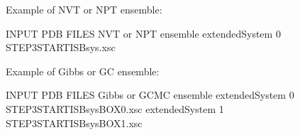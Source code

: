 \documentclass[letterpaper,10pt,english]{sphinxmanual}
\begin{document}
\begin{description}
\sphinxAtStartPar
Example of NVT or NPT ensemble:

\begin{sphinxVerbatim}[commandchars=\\\{\}]
\PYGZsh{}\PYGZsh{}\PYGZsh{}\PYGZsh{}\PYGZsh{}\PYGZsh{}\PYGZsh{}\PYGZsh{}\PYGZsh{}\PYGZsh{}\PYGZsh{}\PYGZsh{}\PYGZsh{}\PYGZsh{}\PYGZsh{}\PYGZsh{}\PYGZsh{}\PYGZsh{}\PYGZsh{}\PYGZsh{}\PYGZsh{}\PYGZsh{}\PYGZsh{}\PYGZsh{}\PYGZsh{}\PYGZsh{}\PYGZsh{}\PYGZsh{}\PYGZsh{}\PYGZsh{}\PYGZsh{}\PYGZsh{}\PYGZsh{}\PYGZsh{}\PYGZsh{}\PYGZsh{}\PYGZsh{}\PYGZsh{}\PYGZsh{}\PYGZsh{}\PYGZsh{}\PYGZsh{}\PYGZsh{}\PYGZsh{}\PYGZsh{}
\PYGZsh{} INPUT PDB FILES \PYGZhy{} NVT or NPT ensemble
\PYGZsh{}\PYGZsh{}\PYGZsh{}\PYGZsh{}\PYGZsh{}\PYGZsh{}\PYGZsh{}\PYGZsh{}\PYGZsh{}\PYGZsh{}\PYGZsh{}\PYGZsh{}\PYGZsh{}\PYGZsh{}\PYGZsh{}\PYGZsh{}\PYGZsh{}\PYGZsh{}\PYGZsh{}\PYGZsh{}\PYGZsh{}\PYGZsh{}\PYGZsh{}\PYGZsh{}\PYGZsh{}\PYGZsh{}\PYGZsh{}\PYGZsh{}\PYGZsh{}\PYGZsh{}\PYGZsh{}\PYGZsh{}\PYGZsh{}\PYGZsh{}\PYGZsh{}\PYGZsh{}\PYGZsh{}\PYGZsh{}\PYGZsh{}\PYGZsh{}\PYGZsh{}\PYGZsh{}\PYGZsh{}\PYGZsh{}\PYGZsh{}
extendedSystem   0   STEP3\PYGZus{}START\PYGZus{}ISB\PYGZus{}sys.xsc
\end{sphinxVerbatim}

\sphinxAtStartPar
Example of Gibbs or GC ensemble:

\begin{sphinxVerbatim}[commandchars=\\\{\}]
\PYGZsh{}\PYGZsh{}\PYGZsh{}\PYGZsh{}\PYGZsh{}\PYGZsh{}\PYGZsh{}\PYGZsh{}\PYGZsh{}\PYGZsh{}\PYGZsh{}\PYGZsh{}\PYGZsh{}\PYGZsh{}\PYGZsh{}\PYGZsh{}\PYGZsh{}\PYGZsh{}\PYGZsh{}\PYGZsh{}\PYGZsh{}\PYGZsh{}\PYGZsh{}\PYGZsh{}\PYGZsh{}\PYGZsh{}\PYGZsh{}\PYGZsh{}\PYGZsh{}\PYGZsh{}\PYGZsh{}\PYGZsh{}\PYGZsh{}\PYGZsh{}\PYGZsh{}\PYGZsh{}\PYGZsh{}\PYGZsh{}\PYGZsh{}\PYGZsh{}\PYGZsh{}\PYGZsh{}\PYGZsh{}\PYGZsh{}\PYGZsh{}
\PYGZsh{} INPUT PDB FILES \PYGZhy{} Gibbs or GCMC ensemble
\PYGZsh{}\PYGZsh{}\PYGZsh{}\PYGZsh{}\PYGZsh{}\PYGZsh{}\PYGZsh{}\PYGZsh{}\PYGZsh{}\PYGZsh{}\PYGZsh{}\PYGZsh{}\PYGZsh{}\PYGZsh{}\PYGZsh{}\PYGZsh{}\PYGZsh{}\PYGZsh{}\PYGZsh{}\PYGZsh{}\PYGZsh{}\PYGZsh{}\PYGZsh{}\PYGZsh{}\PYGZsh{}\PYGZsh{}\PYGZsh{}\PYGZsh{}\PYGZsh{}\PYGZsh{}\PYGZsh{}\PYGZsh{}\PYGZsh{}\PYGZsh{}\PYGZsh{}\PYGZsh{}\PYGZsh{}\PYGZsh{}\PYGZsh{}\PYGZsh{}\PYGZsh{}\PYGZsh{}\PYGZsh{}\PYGZsh{}\PYGZsh{}
extendedSystem   0   STEP3\PYGZus{}START\PYGZus{}ISB\PYGZus{}sys\PYGZus{}BOX\PYGZus{}0.xsc
extendedSystem   1   STEP3\PYGZus{}START\PYGZus{}ISB\PYGZus{}sys\PYGZus{}BOX\PYGZus{}1.xsc
\end{sphinxVerbatim}


\end{description}
\end{document}
